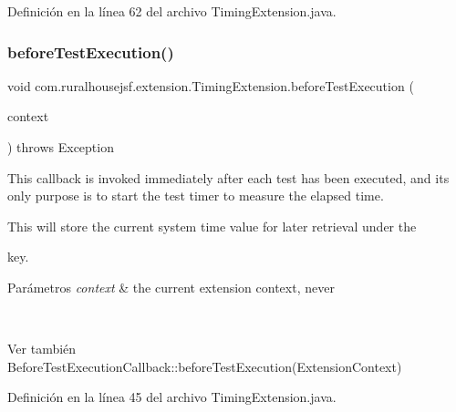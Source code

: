 Definición en la línea 62 del archivo Timing\+Extension.\+java.

\mbox{\label{classcom_1_1ruralhousejsf_1_1extension_1_1_timing_extension_ad19d0a2513bd9041f9263c1d9536ed6c}} 
\subsubsection{\texorpdfstring{beforeTestExecution()}{beforeTestExecution()}}
{\footnotesize\ttfamily void com.\+ruralhousejsf.\+extension.\+Timing\+Extension.\+before\+Test\+Execution (\begin{DoxyParamCaption}\item[{Extension\+Context}]{context }\end{DoxyParamCaption}) throws Exception}

This callback is invoked {\ttfamily immediately after} each test has been executed, and its only purpose is to start the test timer to measure the elapsed time. 

This will store the current system time value for later retrieval under the
\begin{DoxyCode}{0}
\end{DoxyCode}
 key.


\begin{DoxyParams}{Parámetros}
{\em context} & the current extension context, never
\begin{DoxyCode}{1}
\DoxyCodeLine{\textcolor{keyword}{null} }
\end{DoxyCode}
\\
\hline
\end{DoxyParams}
\begin{DoxySeeAlso}{Ver también}
Before\+Test\+Execution\+Callback\+::before\+Test\+Execution(\+Extension\+Context) 
\end{DoxySeeAlso}


Definición en la línea 45 del archivo Timing\+Extension.\+java.

\mbox{\label{classcom_1_1ruralhousejsf_1_1extension_1_1_timing_extension_a489c3097fd687a25391189f3fec56fa8}} 
